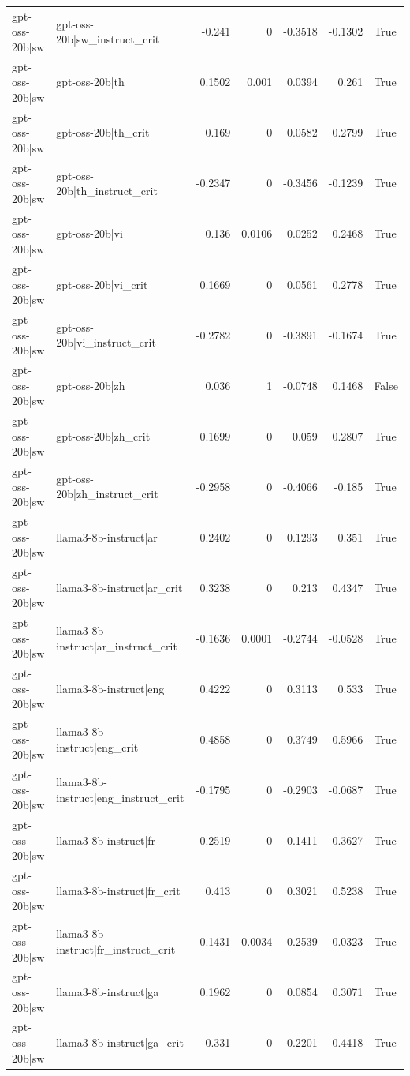 \begin{table}
\begin{tabular}{l l r r r r l}
gpt-oss-20b|sw & gpt-oss-20b|sw_instruct_crit & -0.241 & 0 & -0.3518 & -0.1302 & True \\
gpt-oss-20b|sw & gpt-oss-20b|th & 0.1502 & 0.001 & 0.0394 & 0.261 & True \\
gpt-oss-20b|sw & gpt-oss-20b|th_crit & 0.169 & 0 & 0.0582 & 0.2799 & True \\
gpt-oss-20b|sw & gpt-oss-20b|th_instruct_crit & -0.2347 & 0 & -0.3456 & -0.1239 & True \\
gpt-oss-20b|sw & gpt-oss-20b|vi & 0.136 & 0.0106 & 0.0252 & 0.2468 & True \\
gpt-oss-20b|sw & gpt-oss-20b|vi_crit & 0.1669 & 0 & 0.0561 & 0.2778 & True \\
gpt-oss-20b|sw & gpt-oss-20b|vi_instruct_crit & -0.2782 & 0 & -0.3891 & -0.1674 & True \\
gpt-oss-20b|sw & gpt-oss-20b|zh & 0.036 & 1 & -0.0748 & 0.1468 & False \\
gpt-oss-20b|sw & gpt-oss-20b|zh_crit & 0.1699 & 0 & 0.059 & 0.2807 & True \\
gpt-oss-20b|sw & gpt-oss-20b|zh_instruct_crit & -0.2958 & 0 & -0.4066 & -0.185 & True \\
gpt-oss-20b|sw & llama3-8b-instruct|ar & 0.2402 & 0 & 0.1293 & 0.351 & True \\
gpt-oss-20b|sw & llama3-8b-instruct|ar_crit & 0.3238 & 0 & 0.213 & 0.4347 & True \\
gpt-oss-20b|sw & llama3-8b-instruct|ar_instruct_crit & -0.1636 & 0.0001 & -0.2744 & -0.0528 & True \\
gpt-oss-20b|sw & llama3-8b-instruct|eng & 0.4222 & 0 & 0.3113 & 0.533 & True \\
gpt-oss-20b|sw & llama3-8b-instruct|eng_crit & 0.4858 & 0 & 0.3749 & 0.5966 & True \\
gpt-oss-20b|sw & llama3-8b-instruct|eng_instruct_crit & -0.1795 & 0 & -0.2903 & -0.0687 & True \\
gpt-oss-20b|sw & llama3-8b-instruct|fr & 0.2519 & 0 & 0.1411 & 0.3627 & True \\
gpt-oss-20b|sw & llama3-8b-instruct|fr_crit & 0.413 & 0 & 0.3021 & 0.5238 & True \\
gpt-oss-20b|sw & llama3-8b-instruct|fr_instruct_crit & -0.1431 & 0.0034 & -0.2539 & -0.0323 & True \\
gpt-oss-20b|sw & llama3-8b-instruct|ga & 0.1962 & 0 & 0.0854 & 0.3071 & True \\
gpt-oss-20b|sw & llama3-8b-instruct|ga_crit & 0.331 & 0 & 0.2201 & 0.4418 & True \\

\end{tabular}
\end{table}
